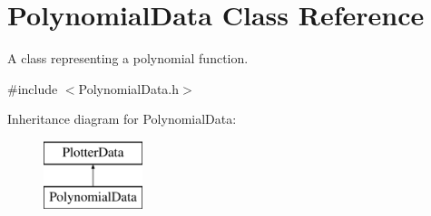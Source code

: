 \hypertarget{class_polynomial_data}{\section{Polynomial\-Data Class Reference}
\label{class_polynomial_data}
}


A class representing a polynomial function.  




{\ttfamily \#include $<$Polynomial\-Data.\-h$>$}

Inheritance diagram for Polynomial\-Data\-:\begin{figure}[H]
\begin{center}
\leavevmode
\includegraphics[height=2.000000cm]{class_polynomial_data}
\end{center}
\end{figure}
